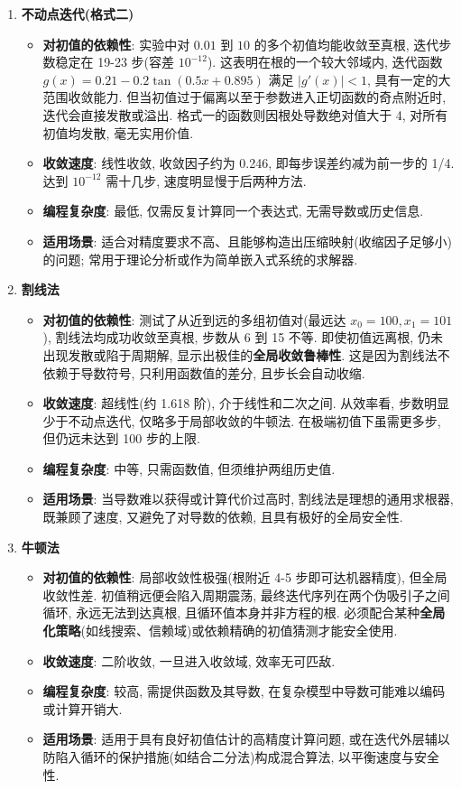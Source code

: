 \documentclass[12pt,a4paper]{ctexart}
\begin{document}
\begin{enumerate}
    \item \textbf{不动点迭代(格式二)}
    \begin{itemize}
        \item \textbf{对初值的依赖性}: 实验中对 $0.01$ 到 $10$ 的多个初值均能收敛至真根, 迭代步数稳定在 19-23 步(容差 $10^{-12}$). 这表明在根的一个较大邻域内, 迭代函数 $g(x)=0.21-0.2\tan(0.5x+0.895)$ 满足 $|g'(x)|<1$, 具有一定的大范围收敛能力. 但当初值过于偏离以至于参数进入正切函数的奇点附近时, 迭代会直接发散或溢出. 格式一的函数则因根处导数绝对值大于 4, 对所有初值均发散, 毫无实用价值. 
        \item \textbf{收敛速度}: 线性收敛, 收敛因子约为 0.246, 即每步误差约减为前一步的 1/4. 达到 $10^{-12}$ 需十几步, 速度明显慢于后两种方法. 
        \item \textbf{编程复杂度}: 最低, 仅需反复计算同一个表达式, 无需导数或历史信息. 
        \item \textbf{适用场景}: 适合对精度要求不高、且能够构造出压缩映射(收缩因子足够小)的问题; 常用于理论分析或作为简单嵌入式系统的求解器. 
    \end{itemize}
    
    \item \textbf{割线法}
    \begin{itemize}
        \item \textbf{对初值的依赖性}: 测试了从近到远的多组初值对(最远达 $x_0=100, x_1=101$), 割线法均成功收敛至真根, 步数从 6 到 15 不等. 即使初值远离根, 仍未出现发散或陷于周期解, 显示出极佳的\textbf{全局收敛鲁棒性}. 这是因为割线法不依赖于导数符号, 只利用函数值的差分, 且步长会自动收缩. 
        \item \textbf{收敛速度}: 超线性(约 1.618 阶), 介于线性和二次之间. 从效率看, 步数明显少于不动点迭代, 仅略多于局部收敛的牛顿法. 在极端初值下虽需更多步, 但仍远未达到 100 步的上限. 
        \item \textbf{编程复杂度}: 中等, 只需函数值, 但须维护两组历史值. 
        \item \textbf{适用场景}: 当导数难以获得或计算代价过高时, 割线法是理想的通用求根器, 既兼顾了速度, 又避免了对导数的依赖, 且具有极好的全局安全性. 
    \end{itemize}
    
    \item \textbf{牛顿法}
    \begin{itemize}
        \item \textbf{对初值的依赖性}: 局部收敛性极强(根附近 4-5 步即可达机器精度), 但全局收敛性差. 初值稍远便会陷入周期震荡, 最终迭代序列在两个伪吸引子之间循环, 永远无法到达真根, 且循环值本身并非方程的根. 必须配合某种\textbf{全局化策略}(如线搜索、信赖域)或依赖精确的初值猜测才能安全使用. 
        \item \textbf{收敛速度}: 二阶收敛, 一旦进入收敛域, 效率无可匹敌. 
        \item \textbf{编程复杂度}: 较高, 需提供函数及其导数, 在复杂模型中导数可能难以编码或计算开销大. 
        \item \textbf{适用场景}: 适用于具有良好初值估计的高精度计算问题, 或在迭代外层辅以防陷入循环的保护措施(如结合二分法)构成混合算法, 以平衡速度与安全性. 
    \end{itemize}
\end{enumerate}
\end{document}
